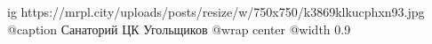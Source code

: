  
 
 
 
 

\ifcmt
  ig https://mrpl.city/uploads/posts/resize/w/750x750/k3869klkucphxn93.jpg
	@caption Санаторий ЦК Угольщиков
  @wrap center
  @width 0.9
\fi
